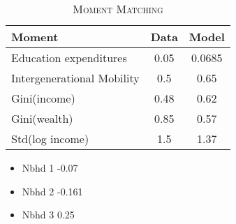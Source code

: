 \begin{landscape}
\begin{table}[h]
\begin{tabular}{@{}lccc@{}}
\bottomrule
\end{tabular}
\end{table}



\begin{table}[h]
\centering
\caption{\textsc{Moment Matching }}
\label{my-label}
\begin{tabular}{@{}lcc@{}}
\toprule
Moment & Data & Model  \\ \midrule
Education expenditures         & 0.05  & 0.0685    \\
Intergenerational Mobility     & 0.5	& 0.65	\\
Gini(income)		& 0.48	& 0.62	\\
Gini(wealth) 	& 0.85	& 0.57 \\
Std(log income)		& 1.5	 & 1.37	\\

\bottomrule
\end{tabular}
\end{table}


\end{landscape}
\restoregeometry
\begin{itemize}
\item Nbhd 1 -0.07
\item Nbhd 2 -0.161
\item Nbhd 3 0.25
\end{itemize}

